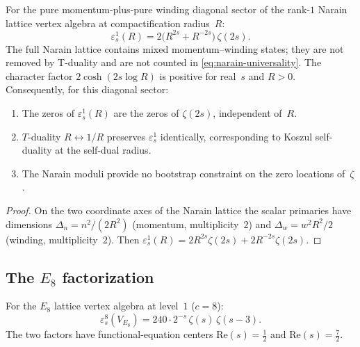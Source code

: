 \begin{theorem}
\label{thm:narain-universality}
\ClaimStatusProvedHere
For the pure momentum-plus-pure winding diagonal sector of the
rank-$1$ Narain lattice vertex algebra at compactification radius~$R$:
\begin{equation}\label{eq:narain-universality}
 \varepsilon^1_s(R)
 = 2\bigl(R^{2s}+R^{-2s}\bigr)\,\zeta(2s).
\end{equation}
The full Narain lattice contains mixed momentum--winding states; they
are not removed by T-duality and are not counted in
\eqref{eq:narain-universality}.
The character factor $2\cosh(2s\log R)$ is positive for
real~$s$ and $R>0$. Consequently, for this diagonal sector:
\begin{enumerate}[label=\textup{(\roman*)}]
\item The zeros of $\varepsilon^1_s(R)$ are the zeros of
$\zeta(2s)$, independent of~$R$.
\item $T$-duality $R\leftrightarrow 1/R$ preserves
$\varepsilon^1_s$ identically, corresponding to Koszul
self-duality at the self-dual radius.
\item The Narain moduli provide no bootstrap constraint on
the zero locations of~$\zeta$.
\end{enumerate}
\end{theorem}

\begin{proof}
On the two coordinate axes of the Narain lattice the scalar primaries
have dimensions
$\Delta_n=n^2/(2R^2)$ (momentum, multiplicity~$2$) and
$\Delta_w=w^2R^2/2$ (winding, multiplicity~$2$). Then
$\varepsilon^1_s(R) = 2R^{2s}\zeta(2s)+2R^{-2s}\zeta(2s)$.
\end{proof}

\subsection{The $E_8$ factorization}

\begin{theorem}
\label{thm:e8-epstein}
\ClaimStatusProvedHere
For the $E_8$ lattice vertex algebra at level~$1$ ($c=8$):
\begin{equation}\label{eq:e8-epstein}
 \varepsilon^8_s(V_{E_8})
 = 240\cdot 2^{-s}\,\zeta(s)\,\zeta(s-3).
\end{equation}
The two factors have functional-equation centers
$\mathrm{Re}(s)=\tfrac12$ and $\mathrm{Re}(s)=\tfrac72$.
\end{theorem}

